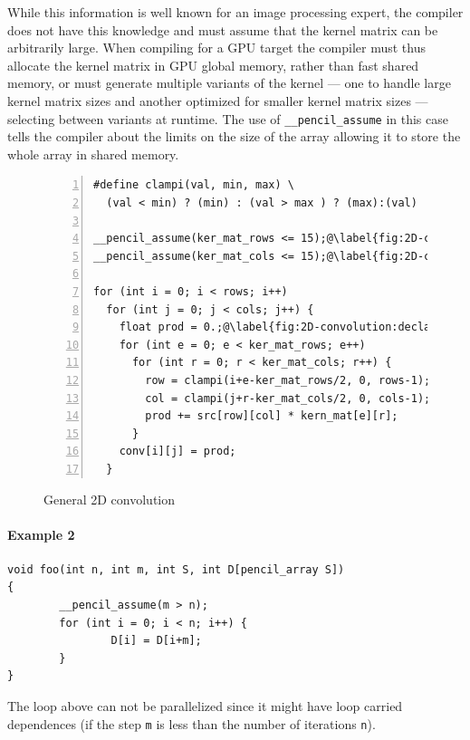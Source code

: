While this information is well known for an image processing expert, the
compiler does not have this knowledge and must assume that the kernel matrix
can be arbitrarily large.  When compiling for a GPU  target the compiler must
thus allocate the kernel matrix in GPU global memory, rather than fast shared
memory, or must generate multiple variants of the kernel --- one to handle large
kernel matrix sizes and another optimized for smaller kernel matrix
sizes --- selecting between variants at runtime.
The use of \lstinline!__pencil_assume! in this case tells the compiler
about the limits on the size of the array allowing it to store
the whole array in shared memory.

\begin{figure}[t]
\begin{lstlisting}[stepnumber=1,numbers=left,numberstyle={\tiny\tt},numbersep=5pt,escapechar=@,language=pencil]
#define clampi(val, min, max) \
  (val < min) ? (min) : (val > max ) ? (max):(val)

__pencil_assume(ker_mat_rows <= 15);@\label{fig:2D-convolution:assume1}@
__pencil_assume(ker_mat_cols <= 15);@\label{fig:2D-convolution:assume2}@

for (int i = 0; i < rows; i++)
  for (int j = 0; j < cols; j++) {
    float prod = 0.;@\label{fig:2D-convolution:declaration}@
    for (int e = 0; e < ker_mat_rows; e++)
      for (int r = 0; r < ker_mat_cols; r++) {
        row = clampi(i+e-ker_mat_rows/2, 0, rows-1);
        col = clampi(j+r-ker_mat_cols/2, 0, cols-1);
        prod += src[row][col] * kern_mat[e][r];
      }
    conv[i][j] = prod;
  }
\end{lstlisting}
\caption{General 2D convolution}
\label{fig:2D-convolution}
\vskip-0.5cm
\end{figure}
  
\paragraph{Example 2}
  \begin{lstlisting}[language=pencil]
void foo(int n, int m, int S, int D[pencil_array S])
{
        __pencil_assume(m > n);
        for (int i = 0; i < n; i++) {
                D[i] = D[i+m];
        }
}
  \end{lstlisting}
The loop above can not be parallelized since it might have loop
carried dependences (if the step \lstinline!m! is less than the
number of iterations \lstinline!n!).

